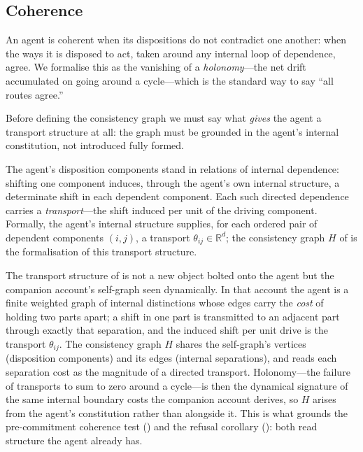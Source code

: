 \documentclass[11pt,twocolumn,a4paper]{article}
\newcommand{\R}{\mathbb{R}}
\begin{document}
\subsection{Coherence}

An agent is coherent when its dispositions do not contradict one another:
when the ways it is disposed to act, taken around any internal loop of
dependence, agree. We formalise this as the vanishing of a
\emph{holonomy}---the net drift accumulated on going around a cycle---which
is the standard way to say ``all routes agree.''

Before defining the consistency graph we must say what \emph{gives} the
agent a transport structure at all: the graph must be grounded in the
agent's internal constitution, not introduced fully formed.

\begin{axiom}
\label{ax:transport}
The agent's disposition components stand in relations of internal
dependence: shifting one component induces, through the agent's own
internal structure, a determinate shift in each dependent component. Each
such directed dependence carries a \emph{transport}---the shift induced per
unit of the driving component. Formally, the agent's internal structure
supplies, for each ordered pair of dependent components $(i,j)$, a transport
$\theta_{ij}\in\R^d$; the consistency graph $H$ of  is
the formalisation of this transport structure.
\end{axiom}

\begin{remark}
\label{rem:H-grounded}
The transport structure of  is not a new object bolted
onto the agent but the companion account's self-graph seen dynamically. In
that account the agent is a finite weighted graph of internal distinctions
whose edges carry the \emph{cost} of holding two parts apart; a shift in one
part is transmitted to an adjacent part through exactly that separation, and
the induced shift per unit drive is the transport $\theta_{ij}$. The
consistency graph $H$ shares the self-graph's vertices (disposition
components) and its edges (internal separations), and reads each separation
cost as the magnitude of a directed transport. Holonomy---the failure of
transports to sum to zero around a cycle---is then the dynamical signature
of the same internal boundary costs the companion account derives, so $H$
arises from the agent's constitution rather than alongside it. This is what
grounds the pre-commitment coherence test () and the
refusal corollary (): both read structure the agent already
has.
\end{remark}
\end{document}
